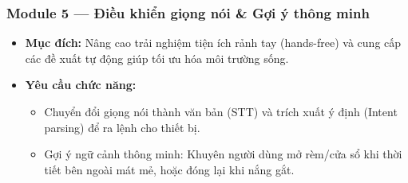 \subsubsection*{Module 5 — Điều khiển giọng nói \& Gợi ý thông minh}
\begin{itemize}
  \item \textbf{Mục đích:} Nâng cao trải nghiệm tiện ích rảnh tay (hands-free) và cung cấp các đề xuất tự động giúp tối ưu hóa môi trường sống.
  \item \textbf{Yêu cầu chức năng:}
    \begin{itemize}
      \item Chuyển đổi giọng nói thành văn bản (STT) và trích xuất ý định (Intent parsing) để ra lệnh cho thiết bị.
      \item Gợi ý ngữ cảnh thông minh: Khuyên người dùng mở rèm/cửa sổ khi thời tiết bên ngoài mát mẻ, hoặc đóng lại khi nắng gắt.
    \end{itemize}

\end{itemize}



